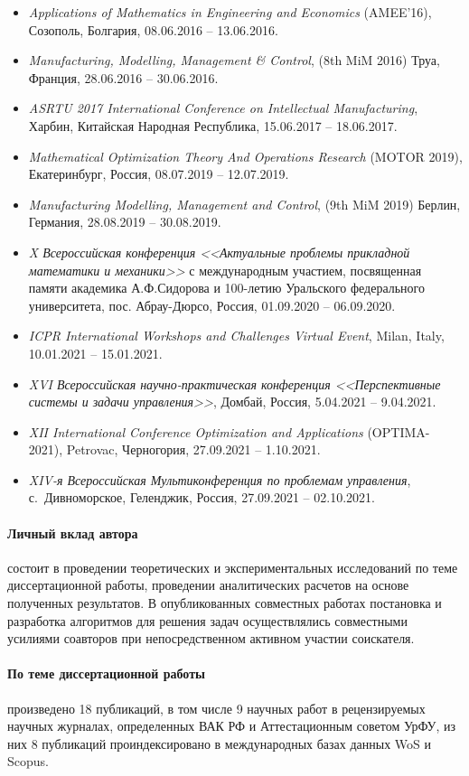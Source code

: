 \begin{itemize}
    \item
    \textit{Applications of Mathematics in Engineering and Economics}
    (AMEE'16),
    Созополь, Болгария,
    08.06.2016 -- 13.06.2016.
    \item
    \textit{Manufacturing, Modelling, Management \& Control},
    (8th MiM 2016)
    Труа, Франция,
    28.06.2016 -- 30.06.2016.
    \item
    \textit{ASRTU 2017 International Conference on Intellectual Manufacturing},
    Харбин, Китайская Народная Республика,
    15.06.2017 -- 18.06.2017.
    \item
    \textit{Mathematical Optimization Theory And Operations Research}
    (MOTOR 2019),
    Екатеринбург, Россия,
    08.07.2019 -- 12.07.2019.
    \item
    \textit{Manufacturing Modelling, Management and Control},
    (9th MiM 2019)
    Берлин, Германия,
    28.08.2019 -- 30.08.2019.
    \item
    \textit{X Всероссийская конференция
    <<Актуальные проблемы прикладной математики и механики>>}
    с международным участием,
    посвященная памяти академика А.Ф.Сидорова и 100-летию Уральского федерального университета,
    пос. Абрау-Дюрсо, Россия,
    01.09.2020 -- 06.09.2020.
    \item
    \textit{ICPR International Workshops and Challenges Virtual Event},
    Milan, Italy,
    10.01.2021 -- 15.01.2021.
    \item
    \textit{XVI Всероссийская научно-практическая конференция
    <<Перспективные системы и задачи управления>>},
    Домбай, Россия,
    5.04.2021 -- 9.04.2021.
    \item
    \textit{XII International Conference Optimization and Applications}
    (OPTIMA-2021),
    Petrovac, Черногория,
    27.09.2021 -- 1.10.2021.
    \item
    \textit{XIV-я Всероссийская Мультиконференция по проблемам управления},
    с.~Дивноморское, Геленджик, Россия,
    27.09.2021 -- 02.10.2021.
\end{itemize}

\paragraph*{Личный вклад автора}
состоит в проведении теоретических и экспериментальных исследований
по теме диссертационной работы,
проведении аналитических расчетов на основе полученных результатов.
В опубликованных совместных работах постановка и разработка алгоритмов для
решения задач осуществлялись совместными усилиями соавторов
при непосредственном активном участии соискателя.

\paragraph*{По теме диссертационной работы}
произведено 18 публикаций,
в том числе
9 научных работ
в рецензируемых научных журналах,
определенных ВАК РФ и
Аттестационным советом УрФУ,
из них
8 публикаций проиндексировано в международных базах данных
WoS и Scopus.
